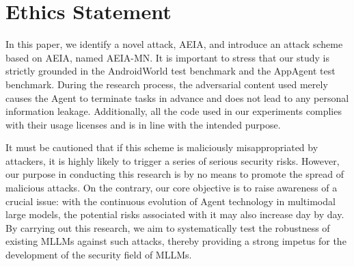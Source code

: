 \section*{Ethics Statement}
In this paper, we identify a novel attack, AEIA, and introduce an attack scheme based on AEIA, named AEIA-MN. It is important to stress that our study is strictly grounded in the AndroidWorld test benchmark and the AppAgent test benchmark. During the research process, the adversarial content used merely causes the Agent to terminate tasks in advance and does not lead to any personal information leakage. Additionally, all the code used in our experiments complies with their usage licenses and is in line with the intended purpose.


It must be cautioned that if this scheme is maliciously misappropriated by attackers, it is highly likely to trigger a series of serious security risks. However, our purpose in conducting this research is by no means to promote the spread of malicious attacks. On the contrary, our core objective is to raise awareness of a crucial issue: with the continuous evolution of Agent technology in multimodal large models, the potential risks associated with it may also increase day by day. By carrying out this research, we aim to systematically test the robustness of existing MLLMs against such attacks, thereby providing a strong impetus for the development of the security field of MLLMs.